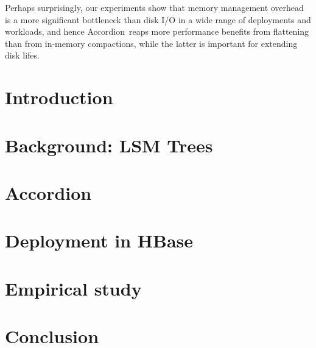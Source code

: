 \documentclass[letterpaper,twocolumn,10pt]{article}
\newcommand{\sys}{Accordion}
\begin{document}
Perhaps surprisingly, our experiments show that memory management overhead is a more significant bottleneck than disk I/O in a
wide range of deployments and workloads, and hence \sys\ reaps more performance benefits from flattening than from in-memory compactions,
while the latter is important for extending disk lifes.


\section{Introduction} \label{sec:intro}
 


\section{Background: LSM Trees} \label{sec:background}
 

\section{\sys} \label{sec:accordion}
 

\section{Deployment in HBase} \label{sec:hbase}

\section{Empirical study} \label{sec:eval}


\section{Conclusion} \label{sec:conclusions}



\newpage




\end{document}
